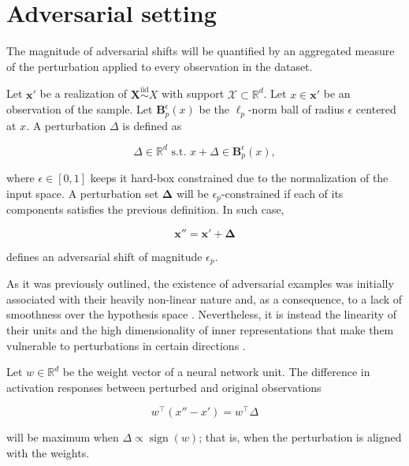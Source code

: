 \section{Adversarial setting}\label{sec:adversarial_setting}

The magnitude of adversarial shifts will be quantified by an aggregated
measure of the perturbation applied to every observation in the dataset.

\begin{definition}\label{def:adversarial_perturbation}
    Let $\bm{x}'$ be a realization of $\bm{X} \overset{\text{iid}}{\sim} X$ with support $\mathcal{X} \subset \mathbb{R}^d$.
    Let $x \in \bm{x}'$ be an observation of the sample.
    Let $\mathbf{B}_p^\epsilon(x)$ be the $\ell_p$-norm ball of radius 
    $\epsilon$ centered at $x$. A perturbation $\Delta$ is defined as

    $$
        \Delta \in \mathbb{R}^d \text{ s.t. } x + \Delta \in \mathbf{B}_p^\epsilon(x),
    $$

    where $\epsilon \in [0, 1]$ keeps it hard-box constrained due to the
    normalization of the input space. A perturbation set $\bm{\Delta}$
    will be $\epsilon_p$-constrained if each of its components
    satisfies the previous definition. In such case,

    $$
        \bm{x}'' = \bm{x}' + \bm{\Delta}
    $$

    defines an adversarial shift of magnitude $\epsilon_p$.
\end{definition}

As it was previously outlined, the existence of adversarial
examples was initially associated with their heavily non-linear nature 
and, as a consequence, to a lack of smoothness over the hypothesis space
\cite{szegedyIntriguingPropertiesNeural2014}.
Nevertheless, it is instead the linearity of their units and the high 
dimensionality of inner representations that make them vulnerable
to perturbations in certain directions
\cite{goodfellowExplainingHarnessingAdversarial2015}.\\

\begin{example}
Let $w \in \mathbb{R}^d$ be the weight vector of a neural network unit.
The difference in activation responses between perturbed and original
observations

$$
w^\top (x'' - x') = w^\top \Delta
$$

will be maximum when $\Delta \propto \operatorname{sign}(w)$; that is,
when the perturbation is aligned with the weights. 
\end{example}

